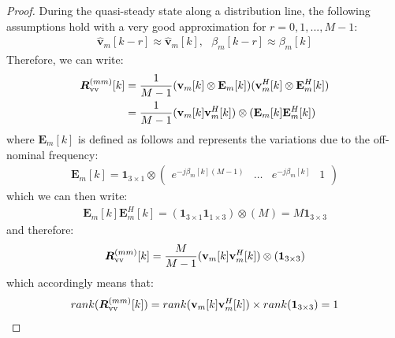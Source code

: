 \documentclass[twocolumn]{IEEEtran}
\newcommand{\bs}{\boldsymbol}
\newcommand{\mb}{\mathbf}
\begin{document}
 \begin{proof}
During the quasi-steady state along a distribution line, the following assumptions hold with a very good approximation for $r=0,1,...,M-1$:
\begin{align}
\hat{\mathbf{v}}_m[k-r] \approx \hat{\mathbf{v}}_m[k],~~~\beta_m[k-r] \approx \beta_m[k]
\end{align}  
Therefore, we can write:
\begin{align}
\begin{split}
\bs R^{(mm)}_{\rm vv}[k]&=\frac{1}{M-1}(\mathbf{v}_m[k] \otimes \mb{E}_m[k])(\mathbf{v}^H_m[k]\otimes \mb{E}_m^H[k])\\
&=\frac{1}{M-1}(\mathbf{v}_m[k]\mathbf{v}^H_m[k])\otimes(\mb{E}_m[k]\mb{E}_m^H[k])
\end{split}
\end{align}
where $\mb{E}_m[k]$ is defined as follows and represents the variations due to the off-nominal frequency:
\begin{align}
\mb{E}_m[k]=\mb{1}_{3\times 1}\otimes\begin{pmatrix}
e^{-j\beta_m[k](M-1)}&\ldots&e^{-j\beta_m[k]}&1\\
\end{pmatrix}
\end{align}
which we can then write:
\begin{align}
\mb{E}_m[k]\mb{E}_m^H[k]=(\mb{1}_{3\times 1}\mb{1}_{1\times 3})\otimes(M)=M\mb{1}_{3\times 3}
\end{align}
and therefore:
\begin{align}
\bs R^{(mm)}_{\rm vv}[k]=\frac{M}{M-1}(\mathbf{v}_m[k]\mathbf{v}^H_m[k])\otimes(\mb{1}_{3 \times 3})
\end{align}
which accordingly means that:
\begin{align*}
rank(\bs R^{(mm)}_{\rm vv}[k])=rank(\mathbf{v}_m[k]\mathbf{v}^H_m[k])\times rank(\mb{1}_{3 \times 3})=1 
\end{align*}


\end{proof}
\end{document}

